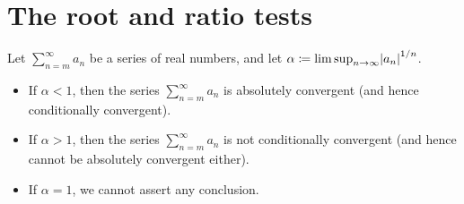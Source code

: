 \section{The root and ratio tests}\label{sec 7.5}

\begin{theorem}\label{7.5.1}
    Let \(\sum_{n = m}^\infty a_n\) be a series of real numbers, and let \(\alpha \coloneqq \limsup_{n \to \infty} \abs*{a_n}^{1 / n}\).
    \begin{itemize}
        \item If \(\alpha < 1\), then the series \(\sum_{n = m}^\infty a_n\) is absolutely convergent
              (and hence conditionally convergent).
        \item If \(\alpha > 1\), then the series \(\sum_{n = m}^\infty a_n\) is not conditionally convergent
              (and hence cannot be absolutely convergent either).
        \item If \(\alpha = 1\), we cannot assert any conclusion.
    \end{itemize}
\end{theorem}

